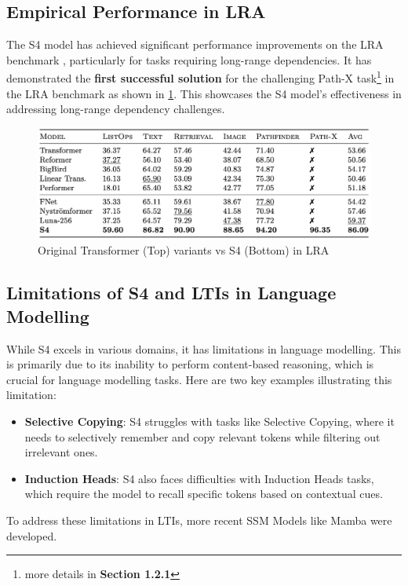 \documentclass[12pt,a4paper]{report}
\begin{document}
\subsection{Empirical Performance in LRA}
The S4 model has achieved significant performance improvements on the LRA benchmark \cite{lra}, particularly for tasks requiring long-range dependencies. It has demonstrated the \textbf{first successful solution} for the challenging Path-X task\footnote{more details in \textbf{Section 1.2.1}} in the LRA benchmark as shown in \ref{s4-lra}. This showcases the S4 model's effectiveness in addressing long-range dependency challenges.

\begin{figure}[ht]
    \centerline{\includegraphics[scale=0.6]{C3.2.5_S4_LRA.png}}
    \caption{Original Transformer (Top) variants vs S4 (Bottom) in LRA}
    \label{s4-lra}
\end{figure}

\subsection{Limitations of S4 and LTIs in Language Modelling}
While S4 excels in various domains, it has limitations in language modelling. This is primarily due to its inability to perform content-based reasoning, which is crucial for language modelling tasks. Here are two key examples illustrating this limitation:
\begin{itemize}
    \item \textbf{Selective Copying}: S4 struggles with tasks like Selective Copying, where it needs to selectively remember and copy relevant tokens while filtering out irrelevant ones.
    \item \textbf{Induction Heads}: S4 also faces difficulties with Induction Heads tasks, which require the model to recall specific tokens based on contextual cues.
\end{itemize}

To address these limitations in LTIs, more recent SSM Models like Mamba \cite{mamba} were developed.
\end{document}
